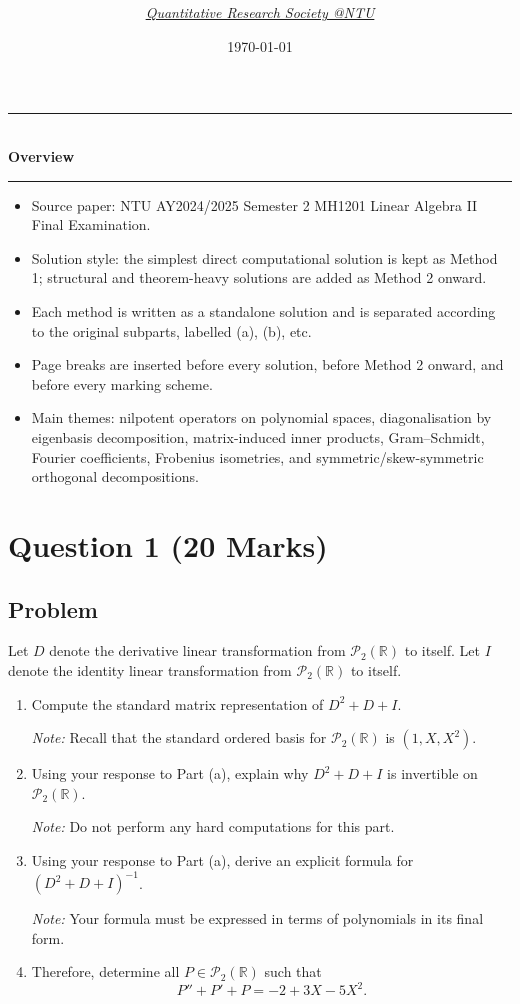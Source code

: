 \documentclass[12pt]{article}
\title{
\Huge \CourseCode\ \CourseName \\[0.3em]
\Large \DocType  \\[0.3em]
\large \ExamMeta
}
\author{
  \textit{\href{https://qrsntu.org}{Quantitative Research Society @NTU}}
}
\date{\today}
\newcommand{\R}{\mathbb{R}}
\newcommand{\cP}{\mathcal{P}}
\newenvironment{overview}{
  \par\bigskip
  \begin{center}
    \rule{0.92\linewidth}{0.6pt}\\[-0.2em]
    \textbf{Overview}\\[-0.2em]
    \rule{0.92\linewidth}{0.6pt}
  \end{center}
  \vspace{-0.3em}
  \begin{itemize}[leftmargin=1.6em, itemsep=0.2em, topsep=0.2em]
}{
  \end{itemize}
  \par\bigskip
}
\begin{document}
\maketitle
\thispagestyle{plainfirst}
\pagestyle{main}

\begin{overview}
  \item Source paper: NTU AY2024/2025 Semester 2 MH1201 Linear Algebra II Final Examination.
  \item Solution style: the simplest direct computational solution is kept as Method 1; structural and theorem-heavy solutions are added as Method 2 onward.
  \item Each method is written as a standalone solution and is separated according to the original subparts, labelled (a), (b), etc.
  \item Page breaks are inserted before every solution, before Method 2 onward, and before every marking scheme.
  \item Main themes: nilpotent operators on polynomial spaces, diagonalisation by eigenbasis decomposition, matrix-induced inner products, Gram--Schmidt, Fourier coefficients, Frobenius isometries, and symmetric/skew-symmetric orthogonal decompositions.
\end{overview}

\newpage
\tableofcontents
\newpage

\section{Question 1 \hfill (20 Marks)}

\subsection{Problem}
Let $D$ denote the derivative linear transformation from $\cP_2(\R)$ to itself. Let $I$ denote the identity linear transformation from $\cP_2(\R)$ to itself.
\begin{enumerate}[label=(\alph*)]
  \item Compute the standard matrix representation of $D^2+D+I$.

  \textit{Note:} Recall that the standard ordered basis for $\cP_2(\R)$ is $(1,X,X^2)$.
  \item Using your response to Part (a), explain why $D^2+D+I$ is invertible on $\cP_2(\R)$.

  \textit{Note:} Do not perform any hard computations for this part.
  \item Using your response to Part (a), derive an explicit formula for $(D^2+D+I)^{-1}$.

  \textit{Note:} Your formula must be expressed in terms of polynomials in its final form.
  \item Therefore, determine all $P\in\cP_2(\R)$ such that
  \[
    P''+P'+P=-2+3X-5X^2.
  \]
\end{enumerate}
\end{document}

